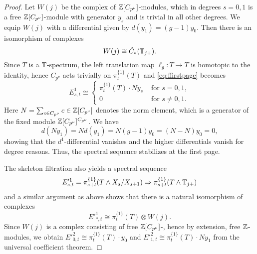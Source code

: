 \begin{proof}
Let $W(j)$ be the complex of $\mathbb{Z}[C_{p^\nu}]$-modules, which
in degrees $s=0,1$ is a free $\mathbb{Z}[C_{p^\nu}]$-module with generator $y_s$ and is trivial in all other degrees. We equip $W(j)$ with a differential given by $d(y_1) = 
(g-1)y_0$. Then there is an isomorphism of complexes
\[W(j)\cong\tilde C_\ast(\mathbb{T}_{j+}).
\]
Since $T$ is a $\mathbb{T}$-spectrum, the left translation map
$\ell_g:T\to T$ is homotopic to the identity, hence $C_{p^\nu}$ acts trivially on $\pi_t^{\{1\}}(T)$ and
\eqref{eq:ffirstpage} becomes
\begin{equation}
E^1_{s,t}\cong \begin{cases}
\pi^{\{1\}}_t(T)\cdot Ny_s &\text{ for } s=0,1,\\
0 &\text{ for } s\neq 0,1.
\end{cases}
\end{equation}
Here $N=\sum_{c\in C_{p^\nu}} c\in \mathbb{Z}[C_{p^\nu}]$ denotes the norm element,
which is a generator of the fixed  module $\mathbb{Z}[C_{p^\nu}]^{C_{p^\nu}}$.
We have
$$d(Ny_1) = Nd(y_1) = N(g-1)y_0 = (N-N)y_0 = 0,$$
showing that the $d^1$-differential vanishes and the higher
differentials vanish for degree reasons. Thus, the spectral sequence 
stabilizes at the first page.

The skeleton filtration also yields a spectral sequence
\begin{equation}\label{eq:ssnonequivariant}
E'^1_{s,t} = \pi^{\{1\}}_{s+t}(T\wedge X_s/X_{s+1})\Rightarrow 
\pi^{\{1\}}_{s+t}(T\wedge\mathbb{T}_{j+})
\end{equation}
and a similar argument as above shows that there is a natural isomorphism of complexes
\begin{equation}\label{eq:firstpage}
E'^1_{\ast,t}\cong \pi^{\{1\}}_t(T)\otimes W(j).
\end{equation}
Since $W(j)$ is a complex consisting of free $\mathbb{Z}[C_{p^\nu}]$-, hence by extension, free $\mathbb{Z}$-modules, we obtain $E'^2_{0,t}\cong \pi^{\{1\}}_t(T)\cdot y_0$ and 
$E'^2_{1,t}\cong \pi^{\{1\}}_t(T)\cdot Ny_1$ from the universal coefficient theorem.




\end{proof}
